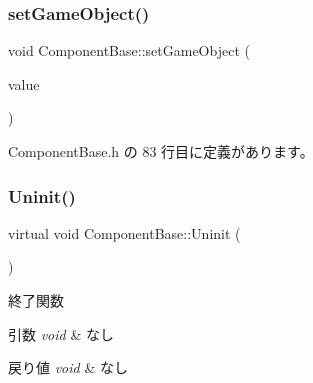\mbox{\label{class_component_base_ae671317076d3c89ba0793ae2cd34d5ea}} 
\subsubsection{\texorpdfstring{set\+Game\+Object()}{setGameObject()}}
{\footnotesize\ttfamily void Component\+Base\+::set\+Game\+Object (\begin{DoxyParamCaption}\item[{\mbox{\hyperlink{class_game_object_base}{Game\+Object\+Base}} $\ast$}]{value }\end{DoxyParamCaption})\hspace{0.3cm}{\ttfamily [inline]}}



 Component\+Base.\+h の 83 行目に定義があります。

\mbox{\label{class_component_base_a9f42beaf0383d6f629819579cab4de57}} 
\subsubsection{\texorpdfstring{Uninit()}{Uninit()}}
{\footnotesize\ttfamily virtual void Component\+Base\+::\+Uninit (\begin{DoxyParamCaption}{ }\end{DoxyParamCaption})\hspace{0.3cm}{\ttfamily [pure virtual]}}



終了関数 


\begin{DoxyParams}{引数}
{\em void} & なし \\
\hline
\end{DoxyParams}

\begin{DoxyRetVals}{戻り値}
{\em void} & なし \\
\hline
\end{DoxyRetVals}


